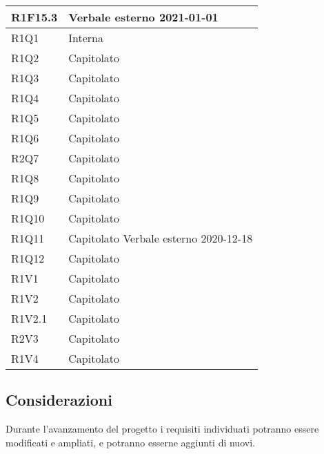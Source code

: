 \begin{center}
\begin{longtable}{|p{22mm}|p{22mm}|}
	\hline
R1F15.3	& Verbale esterno 2021-01-01 \\
	\hline
R1Q1	& Interna\\
	\hline
R1Q2	& Capitolato\\
\hline
R1Q3	& Capitolato\\
\hline
R1Q4	& Capitolato\\
\hline
R1Q5	& Capitolato\\
\hline
R1Q6	& Capitolato\\
\hline
R2Q7	& Capitolato\\
\hline
R1Q8	& Capitolato\\
\hline
R1Q9	& Capitolato\\
\hline
R1Q10	& Capitolato\\
\hline
R1Q11	& Capitolato\newline	
Verbale esterno 2020-12-18 
\\
\hline
R1Q12	& Capitolato\\
\hline
R1V1	& Capitolato\\
	\hline
R1V2	& Capitolato\\
	\hline
R1V2.1	& Capitolato\\
	\hline
R2V3	& Capitolato\\
	\hline
R1V4	& Capitolato\\
	\hline
	
	\end{longtable}
\end{center}

\subsection{Considerazioni}
Durante l'avanzamento del progetto i requisiti individuati potranno essere modificati e ampliati, e potranno esserne aggiunti di nuovi.